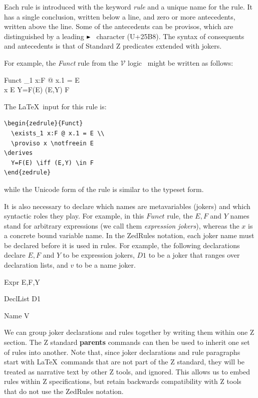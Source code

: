 \documentclass{entcs}
\newcommand{\V}{\mathcal{V}}
\begin{document}
Each rule is introduced with the keyword \emph{rule} and a unique name
for the rule.  It has a single conclusion, written below a line, and
zero or more antecedents, written above the line.  Some of the
antecedents can be provisos, which are distinguished by a leading
$\proviso$ character (U+25B8).  The syntax of consequents and
antecedents is that of Standard Z predicates extended with jokers.

For example, the \emph{Funct} rule from the $\V$
logic~\cite{brien:calculus-schemas-z00} might be written as follows:
\begin{zedrule}{Funct}
  \exists_1 x:F @ x.1 = E \\
  \proviso x \notfreein E
\derives
  Y=F(E) \iff (E,Y) \in F
\end{zedrule}

The \LaTeX\ input for this rule is:
\begin{verbatim}
\begin{zedrule}{Funct}
  \exists_1 x:F @ x.1 = E \\
  \proviso x \notfreein E
\derives
  Y=F(E) \iff (E,Y) \in F
\end{zedrule}
\end{verbatim}
while the Unicode form of the rule is similar to the typeset form.

It is also necessary to declare which names are metavariables
(jokers) and which syntactic roles they play.  For example, in
this $Funct$ rule, the $E,F$ and $Y$ names stand for arbitrary
expressions (we call them \emph{expression jokers}), whereas the $x$
is a concrete bound variable name.  In the ZedRules notation, each
joker name must be declared before it is used in rules.  For example,
the following declarations declare $E,F$ and $Y$ to be expression
jokers, $D1$ to be a joker that ranges over declaration lists, and
$v$ to be a name joker.

\begin{zedjoker}{Expr} E,F,Y \end{zedjoker}
\begin{zedjoker}{DeclList} D1 \end{zedjoker}
\begin{zedjoker}{Name} V \end{zedjoker}

We can group joker declarations and rules together by writing them
within one Z section.  The Z standard \textbf{parents} commands can
then be used to inherit one set of rules into another.  Note that,
since joker declarations and rule paragraphs start with \LaTeX\
commands that are not part of the Z standard, they will be treated as
narrative text by other Z tools, and ignored.  This allows us to embed
rules within Z specifications, but retain backwards compatibility with
Z tools that do not use the ZedRules notation.
\end{document}
